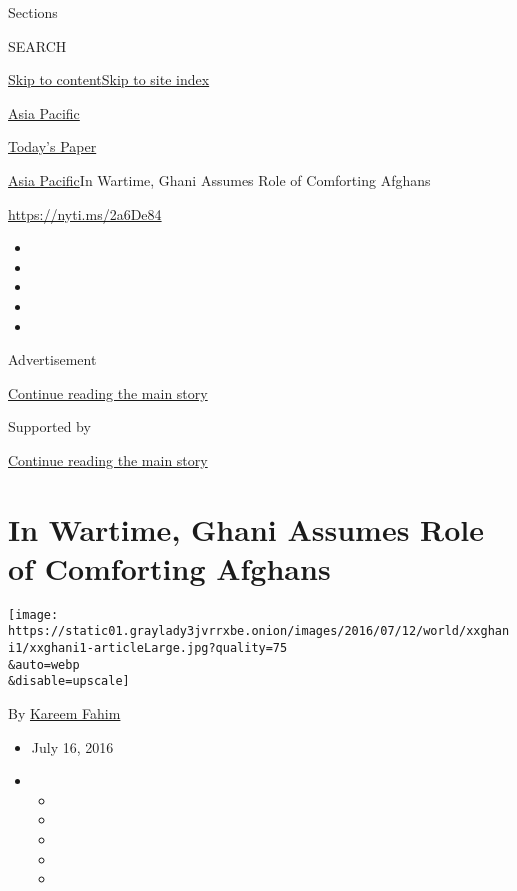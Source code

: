 Sections

SEARCH

\protect\hyperlink{site-content}{Skip to
content}\protect\hyperlink{site-index}{Skip to site index}

\href{https://www.nytimes3xbfgragh.onion/section/world/asia}{Asia
Pacific}

\href{https://myaccount.nytimes3xbfgragh.onion/auth/login?response_type=cookie\&client_id=vi}{}

\href{https://www.nytimes3xbfgragh.onion/section/todayspaper}{Today's
Paper}

\href{/section/world/asia}{Asia Pacific}\textbar{}In Wartime, Ghani
Assumes Role of Comforting Afghans

\url{https://nyti.ms/2a6De84}

\begin{itemize}
\item
\item
\item
\item
\item
\end{itemize}

Advertisement

\protect\hyperlink{after-top}{Continue reading the main story}

Supported by

\protect\hyperlink{after-sponsor}{Continue reading the main story}

\hypertarget{in-wartime-ghani-assumes-role-of-comforting-afghans}{%
\section{In Wartime, Ghani Assumes Role of Comforting
Afghans}\label{in-wartime-ghani-assumes-role-of-comforting-afghans}}

\texttt{[image: https://static01.graylady3jvrrxbe.onion/images/2016/07/12/world/xxghani1/xxghani1-articleLarge.jpg?quality=75\\\&auto=webp\\\&disable=upscale]}

By \href{https://www.nytimes3xbfgragh.onion/by/kareem-fahim}{Kareem
Fahim}

\begin{itemize}
\item
  July 16, 2016
\item
  \begin{itemize}
  \item
  \item
  \item
  \item
  \item
  \end{itemize}
\end{itemize}

